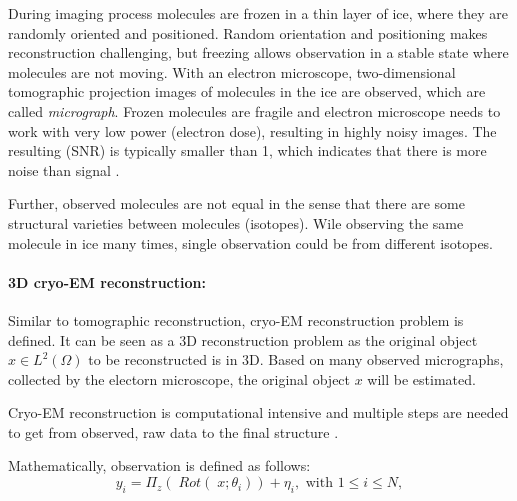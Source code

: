 During imaging process molecules are frozen in a thin layer of ice, where they are randomly oriented and positioned. 
Random orientation and positioning makes reconstruction challenging, 
but freezing allows observation in a stable state where molecules are not moving.
With an electron microscope, two-dimensional tomographic projection images of molecules in the ice are observed,
which are called \textit{micrograph}. 
Frozen molecules are fragile and electron microscope needs to work with
very low power (electron dose), resulting in highly noisy images. The resulting (SNR)
is typically smaller than 1, which indicates that there is more noise than signal \cite{cryoEmMath2}.

Further, observed molecules are not equal in the sense that there are some structural varieties between
molecules (isotopes). Wile observing the same molecule in ice many times, single observation could be from different isotopes.

\paragraph{3D cryo-EM reconstruction:}
Similar to tomographic reconstruction, cryo-EM reconstruction problem \cite{cryoEmMath} is defined.
It can be seen as a 3D reconstruction problem as the original object $x \in L^2(\Omega)$ to be reconstructed is in 3D.
Based on many observed micrographs, collected by the electorn microscope, the original object $x$ will be estimated.

Cryo-EM reconstruction is computational intensive and multiple steps are needed to get from observed, raw data to the final structure \cite{singleParticleCryoEm}.

Mathematically, observation is defined as follows:
\begin{equation}
    \label{eq:cryoEmSimple}
    y_i = \Pi_z  (\; Rot (\;x; \theta_i )) + \eta_i, \text{ with } 1 \leq i \leq N,
\end{equation}

